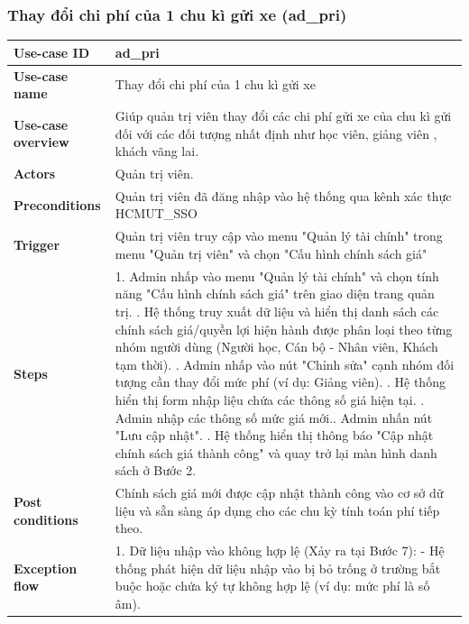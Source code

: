\subsubsection{Thay đổi chi phí của 1 chu kì gửi xe (ad\_pri)}
\begingroup
\small
\begin{longtable}{|>{\centering\arraybackslash}m{3cm}|m{13.7cm}|}
\hline
\textbf{Use-case ID} & ad\_pri \\ \hline
\textbf{Use-case name} & Thay đổi chi phí của 1 chu kì gửi xe \\ \hline
\textbf{Use-case overview} & Giúp quản trị viên thay đổi các chi phí gửi xe của  chu kì gửi đối với các đối tượng nhất định như học viên, giảng viên , khách vãng lai. \\ \hline
\textbf{Actors} & Quản trị viên. \\ \hline
\textbf{Preconditions} & Quản trị viên đã đăng nhập vào hệ thống qua kênh xác thực HCMUT\_SSO \\ \hline
\textbf{Trigger} & Quản trị viên truy cập vào menu "Quản lý tài chính" trong menu "Quản trị viên" và chọn "Cấu hình chính sách giá" \\ \hline
\textbf{Steps} & 
1. Admin nhấp vào menu "Quản lý tài chính" và chọn tính năng "Cấu hình chính sách giá" trên giao diện trang quản trị. \newline
2. Hệ thống truy xuất dữ liệu và hiển thị danh sách các chính sách giá/quyền lợi hiện hành được phân loại theo từng nhóm người dùng (Người học, Cán bộ - Nhân viên, Khách tạm thời). \newline
3. Admin nhấp vào nút "Chỉnh sửa" cạnh nhóm đối tượng cần thay đổi mức phí (ví dụ: Giảng viên). \newline
4. Hệ thống hiển thị form nhập liệu chứa các thông số giá hiện tại. \newline
5. Admin nhập các thông số mức giá mới.\newline
6. Admin nhấn nút "Lưu cập nhật". \newline
7. Hệ thống hiển thị thông báo "Cập nhật chính sách giá thành công" và quay trở lại màn hình danh sách ở Bước 2.\\ \hline
\textbf{Post conditions} &  Chính sách giá mới được cập nhật thành công vào cơ sở dữ liệu và sẵn sàng áp dụng cho các chu kỳ tính toán phí tiếp theo.\\ \hline
\textbf{Exception flow} & 
1. Dữ liệu nhập vào không hợp lệ (Xảy ra tại Bước 7): \newline
- Hệ thống phát hiện dữ liệu nhập vào bị bỏ trống ở trường bắt buộc hoặc chứa ký tự không hợp lệ (ví dụ: mức phí là số âm). \newline

\end{longtable}
